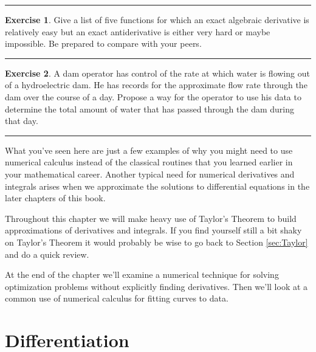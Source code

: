 \documentclass[
]{book}
\theoremstyle{definition}
\theoremstyle{definition}
\theoremstyle{definition}
\newtheorem{exercise}{Exercise}[chapter]
\theoremstyle{remark}
\begin{document}
\begin{center}\rule{0.5\linewidth}{0.5pt}\end{center}

\begin{exercise}
\protect\hypertarget{exr:unnamed-chunk-135}{}{\label{exr:unnamed-chunk-135} }Give a list of five functions for which an exact algebraic derivative is
relatively easy but an exact antiderivative is either very hard or maybe
impossible. Be prepared to compare with your peers.
\end{exercise}

\begin{center}\rule{0.5\linewidth}{0.5pt}\end{center}

\begin{exercise}
\protect\hypertarget{exr:unnamed-chunk-136}{}{\label{exr:unnamed-chunk-136} }A dam operator has control of the rate at which water is flowing out of
a hydroelectric dam. He has records for the approximate flow rate
through the dam over the course of a day. Propose a way for the operator
to use his data to determine the total amount of water that has passed
through the dam during that day.
\end{exercise}

\begin{center}\rule{0.5\linewidth}{0.5pt}\end{center}

What you've seen here are just a few examples of why you might need to
use numerical calculus instead of the classical routines that you
learned earlier in your mathematical career. Another typical need for
numerical derivatives and integrals arises when we approximate the
solutions to differential equations in the later chapters of this book.

Throughout this chapter we will make heavy use of Taylor's Theorem to
build approximations of derivatives and integrals. If you find yourself
still a bit shaky on Taylor's Theorem it would probably be wise to go
back to Section \ref{sec:Taylor} and do a quick review.

At the end of the chapter
we'll examine a numerical technique for solving optimization problems
without explicitly finding derivatives. Then we'll look at a common use
of numerical calculus for fitting curves to data.

\hypertarget{differentiation}{%
\section{Differentiation}\label{differentiation}}
\end{document}
